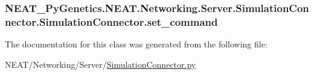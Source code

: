 \subsubsection[{\texorpdfstring{set\+\_\+command}{set_command}}]{\setlength{\rightskip}{0pt plus 5cm}N\+E\+A\+T\+\_\+\+Py\+Genetics.\+N\+E\+A\+T.\+Networking.\+Server.\+Simulation\+Connector.\+Simulation\+Connector.\+set\+\_\+command\hspace{0.3cm}{\ttfamily [static]}}\hypertarget{classNEAT__PyGenetics_1_1NEAT_1_1Networking_1_1Server_1_1SimulationConnector_1_1SimulationConnector_ae984255e91818c23a045b807d373bf1b}{}\label{classNEAT__PyGenetics_1_1NEAT_1_1Networking_1_1Server_1_1SimulationConnector_1_1SimulationConnector_ae984255e91818c23a045b807d373bf1b}


The documentation for this class was generated from the following file\+:\begin{DoxyCompactItemize}
\item 
N\+E\+A\+T/\+Networking/\+Server/\hyperlink{SimulationConnector_8py}{Simulation\+Connector.\+py}\end{DoxyCompactItemize}
